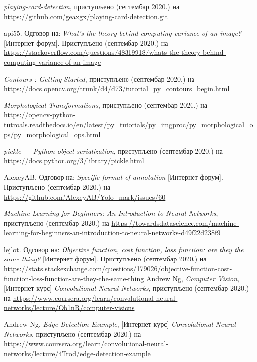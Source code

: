 \documentclass[12pt, а4paper]{article}
\begin{document}
\begin{thebibliography}{99}

\textit{playing-card-detection}, приступљено (септембар 2020.) на
\url{https://github.com/geaxgx/playing-card-detection.git}

api55. Одговор на: \textit{What's the theory behind computing variance of an image?}
[Интернет форум]. Приступљено (септембар 2020.) на
\url{https://stackoverflow.com/questions/48319918/whats-the-theory-behind-computing-variance-of-an-image}

\textit{Contours : Getting Started}, приступљено (септембар 2020.) на
\url{https://docs.opencv.org/trunk/d4/d73/tutorial_py_contours_begin.html}

\textit{Morphological Transformations}, приступљено (септембар 2020.) на
\url{https://opencv-python-tutroals.readthedocs.io/en/latest/py_tutorials/py_imgproc/py_morphological_ops/py_morphological_ops.html}

\textit{pickle — Python object serialization}, приступљено (септембар 2020.) на
\url{https://docs.python.org/3/library/pickle.html}

AlexeyAB. Одговор на: \textit{Specific format of annotation}
[Интернет форум]. Приступљено (септембар 2020.) на
\url{https://github.com/AlexeyAB/Yolo_mark/issues/60}

\textit{Machine Learning for Beginners: An Introduction to Neural Networks}, приступљено (септембар 2020.) на
\url{https://towardsdatascience.com/machine-learning-for-beginners-an-introduction-to-neural-networks-d49f22d238f9}

lejlot. Одговор на: \textit{Objective function, cost function, loss function: are they the same thing?}
[Интернет форум]. Приступљено (септембар 2020.) на
\url{https://stats.stackexchange.com/questions/179026/objective-function-cost-function-loss-function-are-they-the-same-thing}
Andrew Ng, \textit{Computer Vision}, [Интернет курс] \textit{Convolutional
Neural Networks}, приступљено (септембар 2020.) на
\url{https://www.coursera.org/learn/convolutional-neural-networks/lecture/Ob1nR/computer-visions}

Andrew Ng, \textit{Edge Detection Example}, [Интернет курс] \textit{Convolutional
Neural Networks}, приступљено (септембар 2020.) на
\url{https://www.coursera.org/learn/convolutional-neural-networks/lecture/4Trod/edge-detection-example}


\end{thebibliography}
\end{document}
